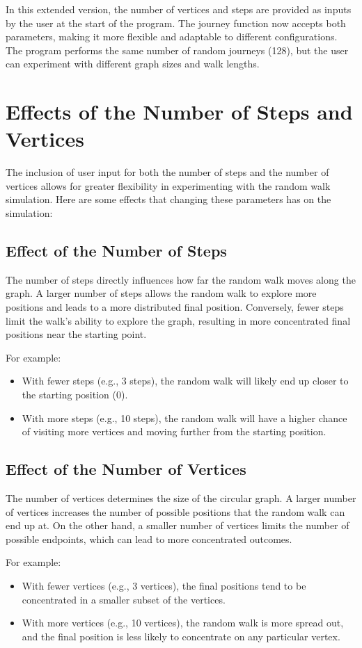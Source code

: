 \documentclass[a4paper,12pt]{amsart}
\begin{document}
In this extended version, the number of vertices and steps are provided as inputs by the user at the start of the program. The journey function now accepts both parameters, making it more flexible and adaptable to different configurations. The program performs the same number of random journeys (128), but the user can experiment with different graph sizes and walk lengths.

\section{Effects of the Number of Steps and Vertices}
The inclusion of user input for both the number of steps and the number of vertices allows for greater flexibility in experimenting with the random walk simulation. Here are some effects that changing these parameters has on the simulation:

\subsection{Effect of the Number of Steps}
The number of steps directly influences how far the random walk moves along the graph. A larger number of steps allows the random walk to explore more positions and leads to a more distributed final position. Conversely, fewer steps limit the walk's ability to explore the graph, resulting in more concentrated final positions near the starting point.

For example:
\begin{itemize}
    \item With fewer steps (e.g., 3 steps), the random walk will likely end up closer to the starting position (0).
    \item With more steps (e.g., 10 steps), the random walk will have a higher chance of visiting more vertices and moving further from the starting position.
\end{itemize}

\subsection{Effect of the Number of Vertices}
The number of vertices determines the size of the circular graph. A larger number of vertices increases the number of possible positions that the random walk can end up at. On the other hand, a smaller number of vertices limits the number of possible endpoints, which can lead to more concentrated outcomes.

For example:
\begin{itemize}
    \item With fewer vertices (e.g., 3 vertices), the final positions tend to be concentrated in a smaller subset of the vertices.
    \item With more vertices (e.g., 10 vertices), the random walk is more spread out, and the final position is less likely to concentrate on any particular vertex.
\end{itemize}
\end{document}
